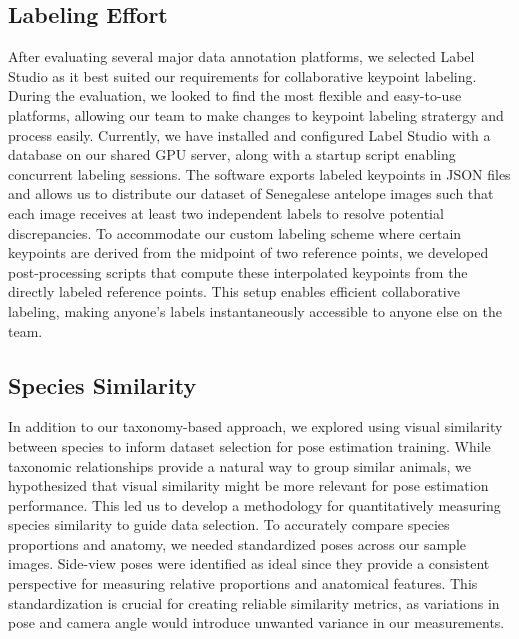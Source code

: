 \documentclass[conference]{IEEEtran}
\begin{document}
\subsection{Labeling Effort}
After evaluating several major data annotation platforms, we selected Label Studio as it best suited our requirements for collaborative keypoint labeling. During the evaluation, we looked to find the most flexible and easy-to-use platforms, allowing our team to make changes to keypoint labeling stratergy and process easily. Currently, we have installed and configured Label Studio with a database on our shared GPU server, along with a startup script enabling concurrent labeling sessions.
The software exports labeled keypoints in JSON files and allows us to distribute our dataset of Senegalese antelope images such that each image receives at least two independent labels to resolve potential discrepancies.
To accommodate our custom labeling scheme where certain keypoints are derived from the midpoint of two reference points, we developed post-processing scripts that compute these interpolated keypoints from the directly labeled reference points.
This setup enables efficient collaborative labeling, making anyone’s labels instantaneously accessible to anyone else on the team.

\subsection{Species Similarity}
In addition to our taxonomy-based approach, we explored using visual similarity between species to inform dataset selection for pose estimation training.
While taxonomic relationships provide a natural way to group similar animals, we hypothesized that visual similarity might be more relevant for pose estimation performance.
This led us to develop a methodology for quantitatively measuring species similarity to guide data selection.
To accurately compare species proportions and anatomy, we needed standardized poses across our sample images.
Side-view poses were identified as ideal since they provide a consistent perspective for measuring relative proportions and anatomical features.
This standardization is crucial for creating reliable similarity metrics, as variations in pose and camera angle would introduce unwanted variance in our measurements.
\end{document}
